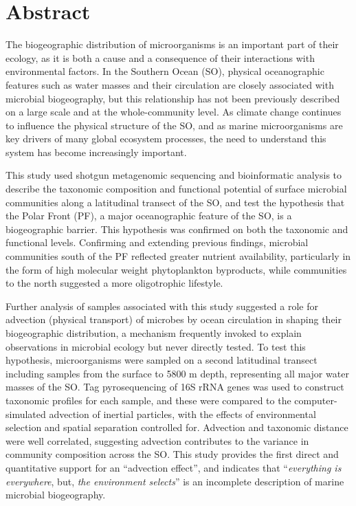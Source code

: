 \chapter*{Abstract}
The biogeographic distribution of microorganisms is an important part of their ecology, as it is both a cause and a consequence of their interactions with environmental factors.
In the Southern Ocean (SO), physical oceanographic features such as water masses and their circulation are closely associated with microbial biogeography, but this relationship has not been previously described on a large scale and at the whole-community level.
As climate change continues to influence the physical structure of the SO, and as marine microorganisms are key drivers of many global ecosystem processes, the need to understand this system has become increasingly important.

This study used shotgun metagenomic sequencing and bioinformatic analysis to describe the taxonomic composition and functional potential of surface microbial communities along a latitudinal transect of the SO, and test the hypothesis that the Polar Front (PF), a major oceanographic feature of the SO, is a biogeographic barrier.
This hypothesis was confirmed on both the taxonomic and functional levels.
Confirming and extending previous findings, microbial communities south of the PF reflected greater nutrient availability, particularly in the form of high molecular weight phytoplankton byproducts, while communities to the north suggested a more oligotrophic lifestyle.

Further analysis of samples associated with this study suggested a role for advection (physical transport) of microbes by ocean circulation in shaping their biogeographic distribution, a mechanism frequently invoked to explain observations in microbial ecology but never directly tested.
To test this hypothesis, microorganisms were sampled on a second latitudinal transect including samples from the surface to 5800 m depth, representing all major water masses of the SO.
Tag pyrosequencing of 16S rRNA genes was used to construct taxonomic profiles for each sample, and these were compared to the computer-simulated advection of inertial particles, with the effects of environmental selection and spatial separation controlled for.
Advection and taxonomic distance were well correlated, suggesting advection contributes to the variance in community composition across the SO.
This study provides the first direct and quantitative support for an ``advection effect'', and indicates that ``\textit{everything is everywhere}, but, \textit{the environment selects}'' is an incomplete description of marine microbial biogeography.
